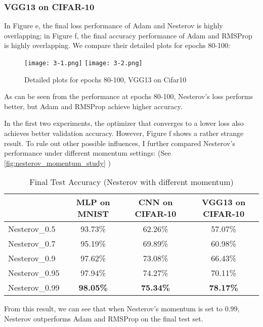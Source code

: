 \documentclass[12pt]{article}
\begin{document}
\subsubsection{VGG13 on CIFAR-10}

In Figure e, the final loss performance of Adam and Nesterov is highly overlapping; in Figure f, the final accuracy performance of Adam and RMSProp is highly overlapping. We compare their detailed plots for epochs 80-100:

\begin{figure}[H]
    \centering
    \texttt{[image: 3-1.png]}
    \texttt{[image: 3-2.png]}
    \caption{Detailed plots for epochs 80-100, VGG13 on Cifar10}
    \label{fig:detailed_vgg13_on_cifar10}
\end{figure}

As can be seen from the performance at epochs 80-100, Nesterov's loss performs better, but Adam and RMSProp achieve higher accuracy.

In the first two experiments, the optimizer that converges to a lower loss also achieves better validation accuracy. However, Figure f shows a rather strange result. To rule out other possible influences, I further compared Nesterov's performance under different momentum settings: (See \ref{fig:nesterov_momentum_study}
)




\begin{table}[H]
\centering
\caption{Final Test Accuracy (Nesterov with different momentum)}
\label{tab:nesterov_study}
\begin{tabular}{|l|c|c|c|}
\hline
              & MLP on MNIST & CNN on CIFAR-10 & VGG13 on CIFAR-10 \\ \hline
Nesterov\_0.5  & 93.73\%      & 62.26\%         & 57.07\%           \\ \hline
Nesterov\_0.7  & 95.19\%      & 69.89\%         & 60.98\%           \\ \hline
Nesterov\_0.9  & 97.62\%      & 73.08\%         & 66.43\%           \\ \hline
Nesterov\_0.95 & 97.94\%      & 74.27\%         & 70.11\%           \\ \hline
Nesterov\_0.99 & \textbf{98.05\%} & \textbf{75.34\%}  & \textbf{78.17\%}    \\ \hline
\end{tabular}
\end{table}

From this result, we can see that when Nesterov's momentum is set to 0.99, Nesterov outperforms Adam and RMSProp on the final test set.
\end{document}
